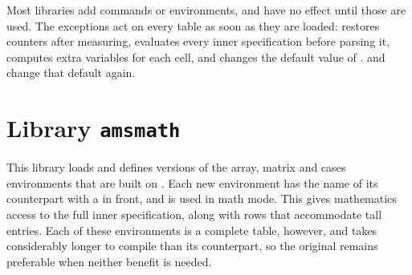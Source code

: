 Most libraries add commands or environments, and have no effect until those are used. The exceptions act on every table as soon as they are loaded:  restores counters after measuring,  evaluates every inner specification before parsing it,  computes extra variables for each cell, and  changes the default value of .  and  change that default again.

\section{Library \texttt{amsmath}}\label{lib:amsmath}
This library loads  and defines versions of the array, matrix and cases environments that are built on . Each new environment has the name of its counterpart with a \vrb{+} in front, and is used in math mode. This gives mathematics access to the full inner specification, along with rows that accommodate tall entries. Each of these environments is a complete table, however, and takes considerably longer to compile than its counterpart, so the original remains preferable when neither benefit is needed.

